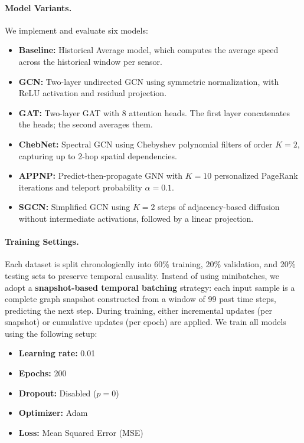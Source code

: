 \documentclass[runningheads]{llncs}
\begin{document}
\paragraph{Model Variants.}
We implement and evaluate six models:
\begin{itemize}
  \item \textbf{Baseline:} Historical Average model, which computes the average speed across the historical window per sensor.
  \item \textbf{GCN:} Two-layer undirected GCN using symmetric normalization, with ReLU activation and residual projection.
  \item \textbf{GAT:} Two-layer GAT with 8 attention heads. The first layer concatenates the heads; the second averages them.
  \item \textbf{ChebNet:} Spectral GCN using Chebyshev polynomial filters of order $K=2$, capturing up to 2-hop spatial dependencies.
  \item \textbf{APPNP:} Predict-then-propagate GNN with $K=10$ personalized PageRank iterations and teleport probability $\alpha=0.1$.
  \item \textbf{SGCN:} Simplified GCN using $K=2$ steps of adjacency-based diffusion without intermediate activations, followed by a linear projection.
\end{itemize}

\paragraph{Training Settings.}
Each dataset is split chronologically into 60\% training, 20\% validation, and 20\% testing sets to preserve temporal causality. Instead of using minibatches, we adopt a \textbf{snapshot-based temporal batching} strategy: each input sample is a complete graph snapshot constructed from a window of 99 past time steps, predicting the next step. During training, either incremental updates (per snapshot) or cumulative updates (per epoch) are applied. We train all models using the following setup:
\begin{itemize}
  \item \textbf{Learning rate:} 0.01
  \item \textbf{Epochs:} 200
  \item \textbf{Dropout:} Disabled ($p=0$)
  \item \textbf{Optimizer:} Adam
  \item \textbf{Loss:} Mean Squared Error (MSE)
\end{itemize}
\end{document}
